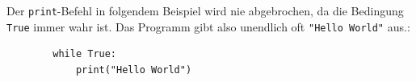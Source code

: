 \begin{myexample}
Der \lstinline|print|-Befehl in folgendem Beispiel wird nie abgebrochen, da die Bedingung \lstinline|True| immer wahr ist. Das Programm gibt also unendlich oft \lstinline|"Hello World"| aus.:
\begin{lstlisting}
		while True:
			print("Hello World")
	\end{lstlisting}
\end{myexample}



% 		

